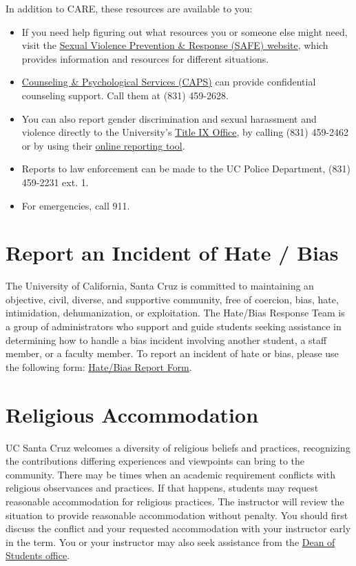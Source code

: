 \documentclass[12pt]{article}
\begin{document}
In addition to CARE, these resources are available to you:
\begin{itemize}
	\item If you need help figuring out what resources you or someone else might need, visit the \href{http://safe.ucsc.edu/}{Sexual Violence Prevention \& Response (SAFE) website}, which provides information and resources for different situations.
	\item \href{https://caps.ucsc.edu/}{Counseling \& Psychological Services (CAPS)} can provide confidential counseling support. Call them at (831) 459-2628.
	\item You can also report gender discrimination and sexual harassment and violence directly to the University's \href{https://titleix.ucsc.edu/}{Title IX Office}, by calling (831) 459-2462 or by using their \href{https://titleix.ucsc.edu/about/staff-contact-us.html}{online reporting tool}.
	\item Reports to law enforcement can be made to the UC Police Department, (831) 459-2231 ext. 1.
	\item For emergencies, call 911.	
\end{itemize}

\section{Report an Incident of Hate / Bias}
The University of California, Santa Cruz is committed to maintaining an objective, civil, diverse, and supportive community, free of coercion, bias, hate, intimidation, dehumanization, or exploitation. The Hate/Bias Response Team is a group of administrators who support and guide students seeking assistance in determining how to handle a bias incident involving another student, a staff member, or a faculty member. To report an incident of hate or bias, please use the following form: \href{https://ucsc-advocate.symplicity.com/care_report/index.php/}{Hate/Bias Report Form}.

\section{Religious Accommodation}
UC Santa Cruz welcomes a diversity of religious beliefs and practices, recognizing the contributions differing experiences and viewpoints can bring to the community. There may be times when an academic requirement conflicts with religious observances and practices. If that happens, students may request reasonable accommodation for religious practices. The instructor will review the situation to provide reasonable accommodation without penalty. You should first discuss the conflict and your requested accommodation with your instructor early in the term. You or your instructor may also seek assistance from the \href{https://deanofstudents.ucsc.edu/}{Dean of Students office}.
\end{document}
